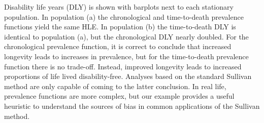 \documentclass[11pt,oneside,a4paper]{article} %
\begin{document}
Disability life years (DLY) is shown with
barplots next to each stationary population.
In population (a) the chronological and time-to-death prevalence functions yield
the same HLE. In population (b) the time-to-death DLY is identical to population
(a), but the chronological DLY nearly doubled. For the chronological prevalence
function, it is correct to conclude that increased longevity leads to
increases in prevalence, but for the time-to-death prevalence function there is
no trade-off. Instead, improved longevity leads to increased proportions of life
lived disability-free. Analyses based on the standard Sullivan method are only
capable of coming to the latter conclusion. In real life, prevalence functions
are more complex, but our example provides a useful heuristic to understand the
sources of bias in common applications of the Sullivan method.
\end{document}
